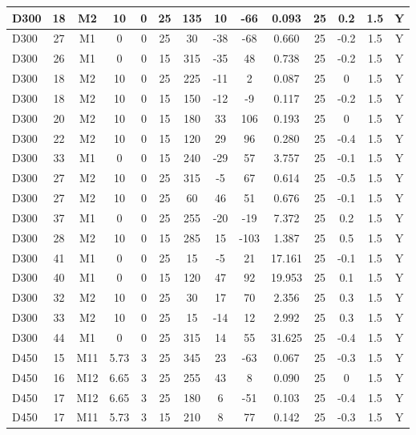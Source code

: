 \documentclass{article}
\begin{document}
\begin{center}
\begin{longtable}{|l|c|c|c|c|c|c|c|c|c|c|c|c|c|}
D300	&	18	&	M2	&	10	&	0	&	25	&	135	&	10	&	-66	&	0.093	&	25	&	0.2	&	1.5	&	Y	\\\hline
D300	&	27	&	M1	&	0	&	0	&	25	&	30	&	-38	&	-68	&	0.660	&	25	&	-0.2	&	1.5	&	Y	\\\hline
D300	&	26	&	M1	&	0	&	0	&	15	&	315	&	-35	&	48	&	0.738	&	25	&	-0.2	&	1.5	&	Y	\\\hline
D300	&	18	&	M2	&	10	&	0	&	25	&	225	&	-11	&	2	&	0.087	&	25	&	0	&	1.5	&	Y	\\\hline
D300	&	18	&	M2	&	10	&	0	&	15	&	150	&	-12	&	-9	&	0.117	&	25	&	-0.2	&	1.5	&	Y	\\\hline
D300	&	20	&	M2	&	10	&	0	&	15	&	180	&	33	&	106	&	0.193	&	25	&	0	&	1.5	&	Y	\\\hline
D300	&	22	&	M2	&	10	&	0	&	15	&	120	&	29	&	96	&	0.280	&	25	&	-0.4	&	1.5	&	Y	\\\hline
D300	&	33	&	M1	&	0	&	0	&	15	&	240	&	-29	&	57	&	3.757	&	25	&	-0.1	&	1.5	&	Y	\\\hline
D300	&	27	&	M2	&	10	&	0	&	25	&	315	&	-5	&	67	&	0.614	&	25	&	-0.5	&	1.5	&	Y	\\\hline
D300	&	27	&	M2	&	10	&	0	&	25	&	60	&	46	&	51	&	0.676	&	25	&	-0.1	&	1.5	&	Y	\\\hline
D300	&	37	&	M1	&	0	&	0	&	25	&	255	&	-20	&	-19	&	7.372	&	25	&	0.2	&	1.5	&	Y	\\\hline
D300	&	28	&	M2	&	10	&	0	&	15	&	285	&	15	&	-103	&	1.387	&	25	&	0.5	&	1.5	&	Y	\\\hline
D300	&	41	&	M1	&	0	&	0	&	25	&	15	&	-5	&	21	&	17.161	&	25	&	-0.1	&	1.5	&	Y	\\\hline
D300	&	40	&	M1	&	0	&	0	&	15	&	120	&	47	&	92	&	19.953	&	25	&	0.1	&	1.5	&	Y	\\\hline
D300	&	32	&	M2	&	10	&	0	&	25	&	30	&	17	&	70	&	2.356	&	25	&	0.3	&	1.5	&	Y	\\\hline
D300	&	33	&	M2	&	10	&	0	&	25	&	15	&	-14	&	12	&	2.992	&	25	&	0.3	&	1.5	&	Y	\\\hline
D300	&	44	&	M1	&	0	&	0	&	25	&	315	&	14	&	55	&	31.625	&	25	&	-0.4	&	1.5	&	Y	\\\hline
D450	&	15	&	M11	&	5.73	&	3	&	25	&	345	&	23	&	-63	&	0.067	&	25	&	-0.3	&	1.5	&	Y	\\\hline
D450	&	16	&	M12	&	6.65	&	3	&	25	&	255	&	43	&	8	&	0.090	&	25	&	0	&	1.5	&	Y	\\\hline
D450	&	17	&	M12	&	6.65	&	3	&	25	&	180	&	6	&	-51	&	0.103	&	25	&	-0.4	&	1.5	&	Y	\\\hline
D450	&	17	&	M11	&	5.73	&	3	&	15	&	210	&	8	&	77	&	0.142	&	25	&	-0.3	&	1.5	&	Y	\\\hline

\end{longtable}
\end{center}
\end{document}
